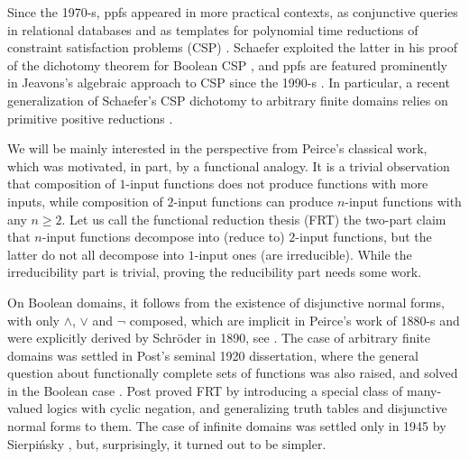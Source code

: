 \documentclass[11pt]{article}
\theoremstyle{plain}
\theoremstyle{definition}
\begin{document}
Since the 1970-s, ppfs appeared in more practical contexts, as conjunctive queries in relational databases \cite{Kosh23} and as templates for polynomial time reductions of constraint satisfaction problems (CSP) \cite{CreVol08,JCG97,Sch78}. Schaefer exploited the latter in his proof of the dichotomy theorem for Boolean CSP \cite{Sch78}, and ppfs are featured prominently in Jeavons's algebraic approach to CSP since the 1990-s \cite{BJK,JCG97}. In particular, a recent generalization of Schaefer's CSP dichotomy to arbitrary finite domains relies on primitive positive reductions \cite{B3KZ}.

We will be mainly interested in the perspective from Peirce's classical work, which was motivated, in part, by a functional analogy. It is a trivial observation that composition of $1$-input functions does not produce functions with more inputs, while composition of $2$-input functions can produce $n$-input functions with any $n\geq2$. Let us call the functional reduction thesis (FRT) the two-part claim that $n$-input functions decompose into (reduce to) $2$-input functions, but the latter do not all decompose into $1$-input ones (are irreducible). While the irreducibility part is trivial, proving the reducibility part needs some work. 

On Boolean domains, it follows from the existence of disjunctive normal forms, with only $\land$, $\lor$ and $\neg$ composed, which are implicit in Peirce's work of 1880-s and were explicitly derived by Schr\"oder in 1890, see \cite{Lew18}. 
The case of arbitrary finite domains was settled in Post's seminal 1920 dissertation, where the general question about functionally complete sets of functions was also raised, and solved in the Boolean case \cite{Urq09}. Post proved FRT by introducing a special class of many-valued logics with cyclic negation, and generalizing truth tables and disjunctive normal forms to them. The case of infinite domains was settled only in 1945 by Sierpi\'nsky \cite{Sier45}, but, surprisingly, it turned out to be simpler.
\end{document}
